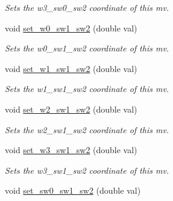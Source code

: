 \begin{DoxyCompactItemize}
\begin{DoxyCompactList}\small\item\em Sets the w3\-\_\-sw0\-\_\-sw2 coordinate of this mv. \end{DoxyCompactList}\item 
\hypertarget{classe3ga_1_1mv_af203c4c3966907c4d75b700b8e89d3a7}{void \hyperlink{classe3ga_1_1mv_af203c4c3966907c4d75b700b8e89d3a7}{set\-\_\-w0\-\_\-sw1\-\_\-sw2} (double val)}\label{classe3ga_1_1mv_af203c4c3966907c4d75b700b8e89d3a7}

\begin{DoxyCompactList}\small\item\em Sets the w0\-\_\-sw1\-\_\-sw2 coordinate of this mv. \end{DoxyCompactList}\item 
\hypertarget{classe3ga_1_1mv_a38b5066f7b4ce8b9d17c6f9387a93399}{void \hyperlink{classe3ga_1_1mv_a38b5066f7b4ce8b9d17c6f9387a93399}{set\-\_\-w1\-\_\-sw1\-\_\-sw2} (double val)}\label{classe3ga_1_1mv_a38b5066f7b4ce8b9d17c6f9387a93399}

\begin{DoxyCompactList}\small\item\em Sets the w1\-\_\-sw1\-\_\-sw2 coordinate of this mv. \end{DoxyCompactList}\item 
\hypertarget{classe3ga_1_1mv_adbffd737dd832ddcb54cb435e013b7d2}{void \hyperlink{classe3ga_1_1mv_adbffd737dd832ddcb54cb435e013b7d2}{set\-\_\-w2\-\_\-sw1\-\_\-sw2} (double val)}\label{classe3ga_1_1mv_adbffd737dd832ddcb54cb435e013b7d2}

\begin{DoxyCompactList}\small\item\em Sets the w2\-\_\-sw1\-\_\-sw2 coordinate of this mv. \end{DoxyCompactList}\item 
\hypertarget{classe3ga_1_1mv_ad98a566ad715c011d6053af900d6eb81}{void \hyperlink{classe3ga_1_1mv_ad98a566ad715c011d6053af900d6eb81}{set\-\_\-w3\-\_\-sw1\-\_\-sw2} (double val)}\label{classe3ga_1_1mv_ad98a566ad715c011d6053af900d6eb81}

\begin{DoxyCompactList}\small\item\em Sets the w3\-\_\-sw1\-\_\-sw2 coordinate of this mv. \end{DoxyCompactList}\item 
\hypertarget{classe3ga_1_1mv_a2cc894efb54a78f683d57dc6f43b9da8}{void \hyperlink{classe3ga_1_1mv_a2cc894efb54a78f683d57dc6f43b9da8}{set\-\_\-sw0\-\_\-sw1\-\_\-sw2} (double val)}\label{classe3ga_1_1mv_a2cc894efb54a78f683d57dc6f43b9da8}


\end{DoxyCompactItemize}
